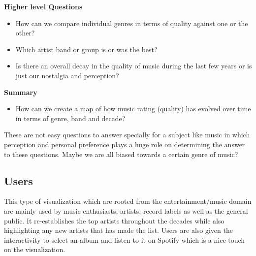 \documentclass{article}
\begin{document}
\textbf{Higher level Questions}
\begin{itemize} 
    \item How can we compare individual genres in terms of quality against one or the other?
    \item Which artist band or group is or was the best?
    \item Is there an overall decay in the quality of music during the last few years or is just our nostalgia and perception?
\end{itemize}

\textbf{Summary}
\begin{itemize} 
    \item How can we create a map of how music rating (quality) has evolved over time in terms of genre, band and decade?
\end{itemize}

These are not easy questions to answer specially for a subject like music in which perception and personal preference plays a huge role on determining the answer to these questions. Maybe we are all biased towards a certain genre of music? 

\subsection{Users}
This type of visualization which are rooted from the entertainment/music domain are mainly used by music enthusiasts, artists, record labels as well as the general public. It re-establishes the top artists throughout the decades while also highlighting any new artists that has made the list. Users are also given the interactivity to select an album and listen to it on Spotify which is a nice touch on the visualization.

        
\end{document}
